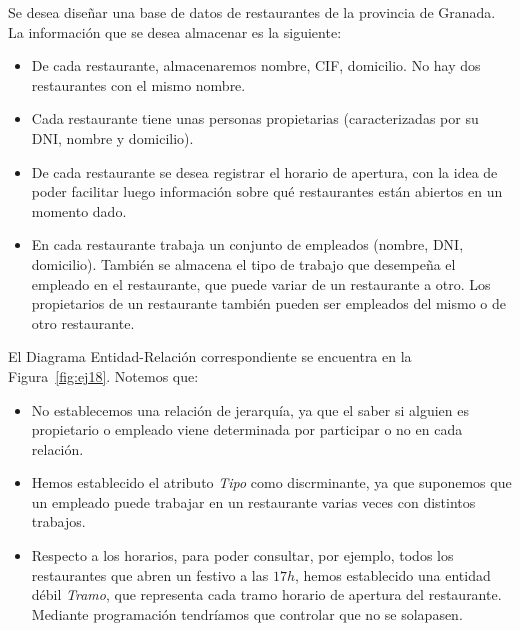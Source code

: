 \begin{ejercicio} \label{ej:18}
    Se desea diseñar una base de datos de restaurantes de la provincia de Granada. La información que se desea
    almacenar es la siguiente:
    \begin{itemize}
        \item De cada restaurante, almacenaremos nombre, CIF, domicilio. No hay dos restaurantes con el mismo
        nombre.
        \item Cada restaurante tiene unas personas propietarias (caracterizadas por su DNI, nombre y domicilio).
        \item De cada restaurante se desea registrar el horario de apertura, con la idea de poder facilitar luego
        información sobre qué restaurantes están abiertos en un momento dado.
        \item En cada restaurante trabaja un conjunto de empleados (nombre, DNI, domicilio). También se
        almacena el tipo de trabajo que desempeña el empleado en el restaurante, que puede variar de un
        restaurante a otro. Los propietarios de un restaurante también pueden ser empleados del mismo o
        de otro restaurante.
    \end{itemize}

    El Diagrama Entidad-Relación correspondiente se encuentra en la Figura~\ref{fig:ej18}.
    Notemos que:
    \begin{itemize}
        \item No establecemos una relación de jerarquía, ya que el saber si alguien es propietario o empleado viene determinada por participar o no en cada relación.
        \item Hemos establecido el atributo \emph{Tipo} como discrminante, ya que suponemos que un empleado puede trabajar en un restaurante varias veces con distintos trabajos.
        \item Respecto a los horarios, para poder consultar, por ejemplo, todos los restaurantes que abren un festivo a las $17h$,
        hemos establecido una entidad débil \emph{Tramo}, que representa cada tramo horario de apertura del restaurante. Mediante programación tendríamos que controlar que no se solapasen.
    \end{itemize}
    \begin{figure}
        \centering
\end{figure}
\end{ejercicio}
